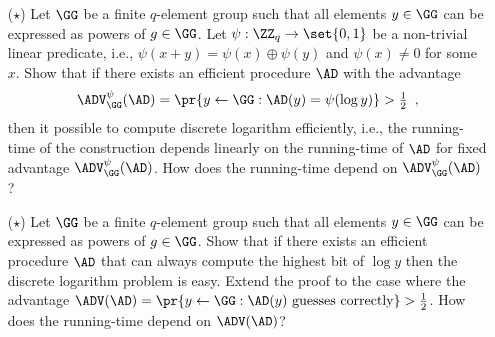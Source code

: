 \documentclass{article}
\begin{document}
\begin{enumerate}
\item[($\star$)] Let $\GG$ be a finite $q$-element group such that all
  elements $y\in\GG$ can be expressed as powers of $g\in\GG$. Let
  $\psi:\ZZ_q\to\set{0,1}$ be a non-trivial linear predicate, i.e.,
  $\psi(x+y)=\psi(x)\oplus\psi(y)$ and $\psi(x)\neq 0$ for some
  $x$. Show that if there exists an efficient procedure $\AD$ with the
  advantage
  \begin{align*}
    \ADV^\psi_\GG(\AD)=\pr{y\gets\GG:\AD(y)=\psi(\log y)} 
     > \textstyle \frac{1}{2}\enspace, 
  \end{align*}
  then it possible to compute discrete logarithm efficiently, i.e.,
  the running-time of the construction depends linearly on the
  running-time of $\AD$ for fixed advantage $\ADV^\psi_\GG(\AD)$. How
  does the running-time depend on $\ADV^\psi_\GG(\AD)$?

\item[($\star$)] Let $\GG$ be a finite $q$-element group such that all
  elements $y\in\GG$ can be expressed as powers of $g\in\GG$. Show
  that if there exists an efficient procedure $\AD$ that can always
  compute the highest bit of $\log y$ then the discrete logarithm
  problem is easy. Extend the proof to the case where the advantage
  $\ADV(\AD)=\pr{y\gets\GG: \AD(y) \text{ guesses correctly}}>
  \frac{1}{2}$. How does the running-time depend on $\ADV(\AD)$?


\end{enumerate}
\end{document}
